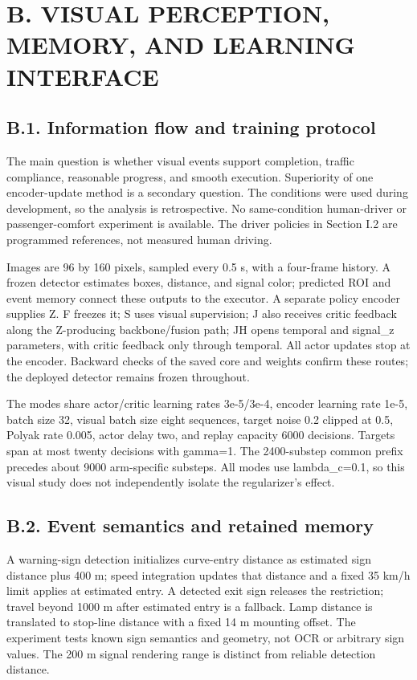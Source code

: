 \documentclass[letterpaper,journal,onecolumn]{IEEEtran}
\begin{document}
\FloatBarrier{}\section*{B. VISUAL PERCEPTION, MEMORY, AND LEARNING INTERFACE}\setcounter{subsection}{0}

\subsection*{B.1. Information flow and training protocol}

The main question is whether visual events support completion, traffic compliance, reasonable progress, and smooth execution. Superiority of one encoder-update method is a secondary question. The conditions were used during development, so the analysis is retrospective. No same-condition human-driver or passenger-comfort experiment is available. The driver policies in Section I.2 are programmed references, not measured human driving.

Images are 96 by 160 pixels, sampled every 0.5 s, with a four-frame history. A frozen detector estimates boxes, distance, and signal color; predicted ROI and event memory connect these outputs to the executor. A separate policy encoder supplies Z. F freezes it; S uses visual supervision; J also receives critic feedback along the Z-producing backbone/fusion path; JH opens temporal and signal\_z parameters, with critic feedback only through temporal. All actor updates stop at the encoder. Backward checks of the saved core and weights confirm these routes; the deployed detector remains frozen throughout.

The modes share actor/critic learning rates 3e-5/3e-4, encoder learning rate 1e-5, batch size 32, visual batch size eight sequences, target noise 0.2 clipped at 0.5, Polyak rate 0.005, actor delay two, and replay capacity 6000 decisions. Targets span at most twenty decisions with gamma=1. The 2400-substep common prefix precedes about 9000 arm-specific substeps. All modes use lambda\_c=0.1, so this visual study does not independently isolate the regularizer's effect.

\subsection*{B.2. Event semantics and retained memory}

A warning-sign detection initializes curve-entry distance as estimated sign distance plus 400 m; speed integration updates that distance and a fixed 35 km/h limit applies at estimated entry. A detected exit sign releases the restriction; travel beyond 1000 m after estimated entry is a fallback. Lamp distance is translated to stop-line distance with a fixed 14 m mounting offset. The experiment tests known sign semantics and geometry, not OCR or arbitrary sign values. The 200 m signal rendering range is distinct from reliable detection distance.
\end{document}

